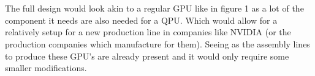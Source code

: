 \\\\
The full design would look akin to a regular GPU like in figure 1 as a lot of the component it needs are also needed for a QPU. Which would allow for a relatively setup for a new production line in companies like NVIDIA (or the production companies which manufacture for them). Seeing as the assembly lines to produce these GPU's are already present and it would only require some smaller modifications.